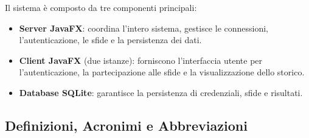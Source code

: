 \documentclass[12pt, a4paper]{article}
\begin{document}
Il sistema è composto da tre componenti principali:
\begin{itemize}[leftmargin=*]
    \item \textbf{Server JavaFX}: coordina l'intero sistema, gestisce le connessioni, l'autenticazione, le sfide e la persistenza dei dati.
    \item \textbf{Client JavaFX} (due istanze): forniscono l'interfaccia utente per l'autenticazione, la partecipazione alle sfide e la visualizzazione dello storico.
    \item \textbf{Database SQLite}: garantisce la persistenza di credenziali, sfide e risultati.
\end{itemize}

\subsection{Definizioni, Acronimi e Abbreviazioni}
\end{document}

